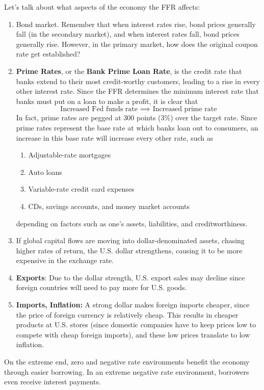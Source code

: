 \documentclass{article}
\begin{document}
    Let's talk about what aspects of the economy the FFR affects: 
    \begin{enumerate}
      \item Bond market. Remember that when interest rates rise, bond prices generally fall (in the secondary market), and when interest rates fall, bond prices generally rise. However, in the primary market, how does the original coupon rate get established? 
      
      \item \textbf{Prime Rates}, or the \textbf{Bank Prime Loan Rate}, is the credit rate that banks extend to their most credit-worthy customers, leading to a rise in every other interest rate. Since the FFR determines the minimum interest rate that banks must put on a loan to make a profit, it is clear that 
      \begin{equation}
        \text{Increased Fed funds rate } \implies \text{ Increased prime rate}
      \end{equation}
      In fact, prime rates are pegged at 300 points (3\%) over the target rate. Since prime rates represent the base rate at which banks loan out to consumers, an increase in this base rate will increase every other rate, such as 
      \begin{enumerate}
          \item Adjustable-rate mortgages
          \item Auto loans
          \item Variable-rate credit card expenses
          \item CDs, savings accounts, and money market accounts
      \end{enumerate}
      depending on factors such as one's assets, liabilities, and creditworthiness. 
      \item If global capital flows are moving into dollar-denominated assets, chasing higher rates of return, the U.S. dollar strengthens, causing it to be more expensive in the exchange rate. 
      \item \textbf{Exports}: Due to the dollar strength, U.S. export sales may decline since foreign countries will need to pay more for U.S. goods. 
      \item \textbf{Imports, Inflation:} A strong dollar makes foreign imports cheaper, since the price of foreign currency is relatively cheap. This results in cheaper products at U.S. stores (since domestic companies have to keep prices low to compete with cheap foreign imports), and these low prices translate to low inflation. 
    \end{enumerate}
    On the extreme end, zero and negative rate environments benefit the economy through easier borrowing. In an extreme negative rate environment, borrowers even receive interest payments. 
\end{document}
